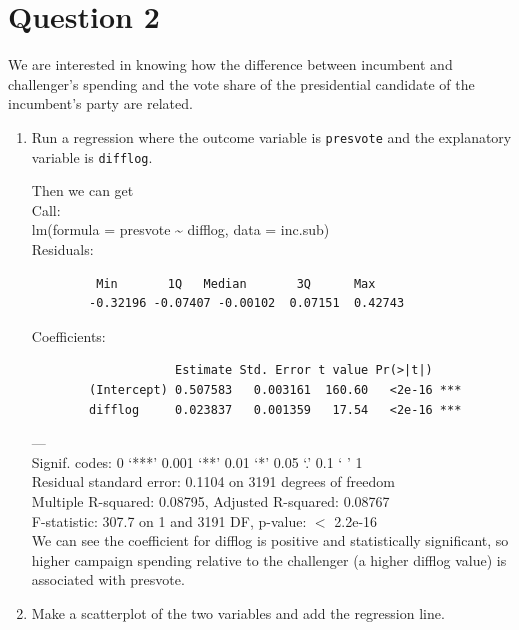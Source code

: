 \documentclass[12pt,letterpaper]{article}
\begin{document}
\section*{Question 2}
\noindent We are interested in knowing how the difference between incumbent and challenger's spending and the vote share of the presidential candidate of the incumbent's party are related.	\vspace{.25cm}
	\begin{enumerate}
		\item Run a regression where the outcome variable is \texttt{presvote} and the explanatory variable is \texttt{difflog}.
		
			 
			
			Then we can get\\
			
		Call:\\
		lm(formula = presvote \~{} difflog, data = inc.sub)\\
		
		
		Residuals:\\
			\begin{verbatim}
		 Min       1Q   Median       3Q      Max 
		-0.32196 -0.07407 -0.00102  0.07151  0.42743 
		\end{verbatim}
		Coefficients:\\
			\begin{verbatim}
	            	Estimate Std. Error t value Pr(>|t|)    
		(Intercept) 0.507583   0.003161  160.60   <2e-16 ***
		difflog     0.023837   0.001359   17.54   <2e-16 ***
		\end{verbatim}
		---\\
		Signif. codes:  0 ‘***’ 0.001 ‘**’ 0.01 ‘*’ 0.05 ‘.’ 0.1 ‘ ’ 1\\
		
		Residual standard error: 0.1104 on 3191 degrees of freedom\\
		Multiple R-squared:  0.08795,	Adjusted R-squared:  0.08767 \\
		F-statistic: 307.7 on 1 and 3191 DF,  p-value: $<$ 2.2e-16\\
		
		We can see the coefficient for difflog is positive and statistically significant, so higher campaign spending relative to the challenger (a higher difflog value) is associated with presvote.
			\vspace{5cm}
		\item Make a scatterplot of the two variables and add the regression line. 
			\begin{figure}[H]\centering
			

\end{figure}
\end{enumerate}
\end{document}
